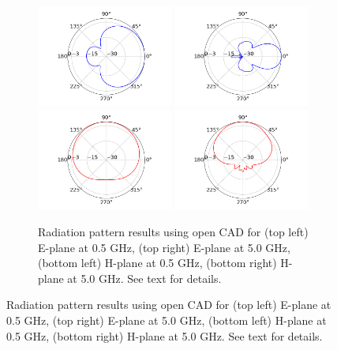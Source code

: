 \documentclass[../../main.tex]{subfiles}
\begin{document}
\begin{figure}[ht]
\centering
\begin{subfigure}{0.65\textwidth}
    \includegraphics[width=0.49\textwidth]{figures/3DHorn_CAD_0_5GHz_E_plane.png}
	\includegraphics[width=0.49\textwidth]{figures/3DHorn_CAD_5GHz_E_plane.png} \\
	\includegraphics[width=0.49\textwidth]{figures/3DHorn_CAD_0_5GHz_H_plane.png}
	\includegraphics[width=0.49\textwidth]{figures/3DHorn_CAD_5GHz_H_plane.png}
    \caption{Radiation pattern results using open CAD for (top left) E-plane at 0.5 GHz, (top right) E-plane at 5.0 GHz, (bottom left) H-plane at 0.5 GHz, (bottom right) H-plane at 5.0 GHz.  See text for details.}

\end{subfigure}
\end{figure}
\end{document}
